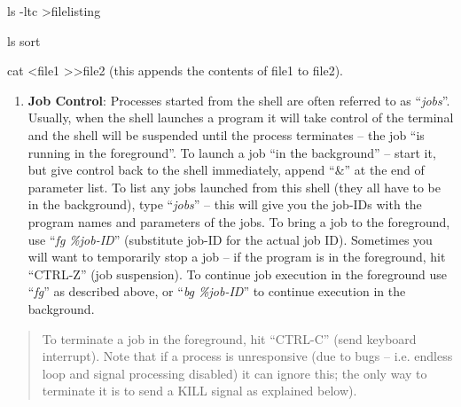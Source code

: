 \documentclass[
]{article}
\begin{document}
ls -ltc \textgreater filelisting

ls \textbar{} sort

cat \textless file1 \textgreater\textgreater file2 (this appends the
contents of file1 to file2).

\begin{enumerate}
\def\labelenumi{\alph{enumi}.}
\setcounter{enumi}{1}
\item
  \textbf{Job Control}: Processes started from the shell are often
  referred to as ``\emph{jobs}''. Usually, when the shell launches a
  program it will take control of the terminal and the shell will be
  suspended until the process terminates -- the job ``is running in the
  foreground''. To launch a job ``in the background'' -- start it, but
  give control back to the shell immediately, append ``\&'' at the end
  of parameter list. To list any jobs launched from this shell (they all
  have to be in the background), type ``\emph{jobs}'' -- this will give
  you the job-IDs with the program names and parameters of the jobs. To
  bring a job to the foreground, use ``\emph{fg \%job-ID}'' (substitute
  job-ID for the actual job ID). Sometimes you will want to temporarily
  stop a job -- if the program is in the foreground, hit ``CTRL-Z'' (job
  suspension). To continue job execution in the foreground use
  ``\emph{fg}'' as described above, or ``\emph{bg \%job-ID}'' to
  continue execution in the background.
\end{enumerate}

\begin{quote}
To terminate a job in the foreground, hit ``CTRL-C'' (send keyboard
interrupt). Note that if a process is unresponsive (due to bugs -- i.e.
endless loop and signal processing disabled) it can ignore this; the
only way to terminate it is to send a KILL signal as explained below).
\end{quote}
\end{document}
